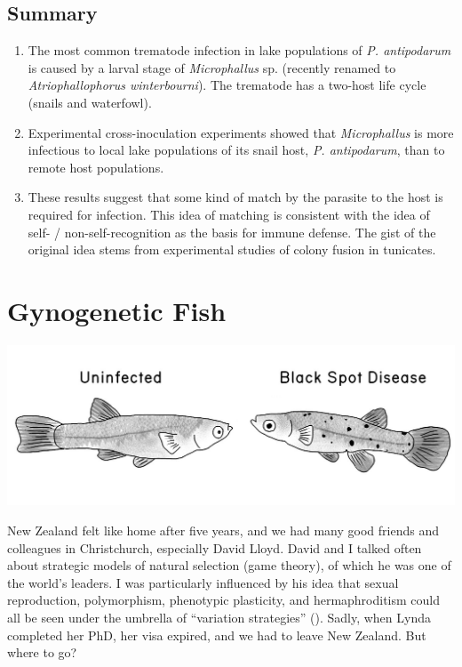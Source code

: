 \documentclass[
  letterpaper,
]{book}
\providecommand{\tightlist}{%
  \setlength{\itemsep}{0pt}\setlength{\parskip}{0pt}}\usepackage{longtable,booktabs,array}
\begin{document}
\section{Summary}\label{summary-3}

\begin{enumerate}
\def\labelenumi{\arabic{enumi}.}
\tightlist
\item
  The most common trematode infection in lake populations of \emph{P.
  antipodarum} is caused by a larval stage of \emph{Microphallus} sp.
  (recently renamed to \emph{Atriophallophorus winterbourni}). The
  trematode has a two-host life cycle (snails and waterfowl).
\item
  Experimental cross-inoculation experiments showed that
  \emph{Microphallus} is more infectious to local lake populations of
  its snail host, \emph{P. antipodarum}, than to remote host
  populations.
\item
  These results suggest that some kind of match by the parasite to the
  host is required for infection. This idea of matching is consistent
  with the idea of self- / non-self-recognition as the basis for immune
  defense. The gist of the original idea stems from experimental studies
  of colony fusion in tunicates.
\end{enumerate}


\chapter{Gynogenetic Fish}\label{sec-gyno}

\begin{center}
\includegraphics{images/fig5-1.jpeg}
\end{center}

New Zealand felt like home after five years, and we had many good
friends and colleagues in Christchurch, especially David Lloyd. David
and I talked often about strategic models of natural selection (game
theory), of which he was one of the world's leaders. I was particularly
influenced by his idea that sexual reproduction, polymorphism,
phenotypic plasticity, and hermaphroditism could all be seen under the
umbrella of ``variation strategies'' (). Sadly, when Lynda completed her PhD, her visa expired, and we
had to leave New Zealand. But where to go?
\end{document}
